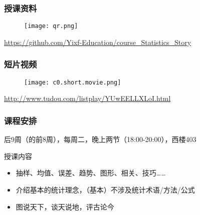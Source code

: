 \begin{frame}
  \frametitle{授课资料}
  \begin{figure}
    \centering
    \texttt{[image: qr.png]}
  \end{figure}
  \begin{center}
    \href{https://github.com/Yixf-Education/course_Statistics_Story}{https://github.com/Yixf-Education/course\_Statistics\_Story}
  \end{center}
\end{frame}

\begin{frame}
  \frametitle{短片视频}
  \begin{figure}
    \centering
    \texttt{[image: c0.short.movie.png]}
  \end{figure}
  \begin{center}
    \href{http://www.tudou.com/listplay/YUwEELLXLoI.html}{http://www.tudou.com/listplay/YUwEELLXLoI.html}
  \end{center}
\end{frame}

\begin{frame}
  \frametitle{课程安排}
  \begin{center}
  \alert{后9周（的前8周），每周二，晚上两节（18:00-20:00），西楼403}\\
  \vspace{0.2cm}
  \end{center}
  \begin{block}{授课内容}
    \begin{itemize}
      \item 抽样、均值、误差、趋势、图形、相关、技巧……
      \item 介绍基本的统计理念，（基本）不涉及统计术语/方法/公式
      \item 图说天下，谈天说地，评古论今
    \end{itemize}
  \end{block}
\end{frame}

